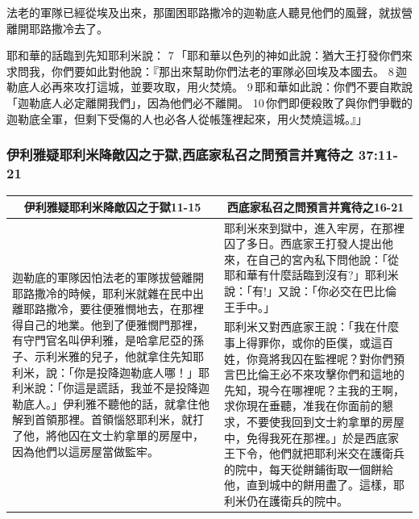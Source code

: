 法老的軍隊已經從埃及出來，那圍困耶路撒冷的迦勒底人聽見他們的風聲，就拔營離開耶路撒冷去了。

耶和華的話臨到先知耶利米說： 7 「耶和華以色列的神如此說：猶大王打發你們來求問我，你們要如此對他說：『那出來幫助你們法老的軍隊必回埃及本國去。 8 迦勒底人必再來攻打這城，並要攻取，用火焚燒。 9 耶和華如此說：你們不要自欺說「迦勒底人必定離開我們」，因為他們必不離開。 10 你們即便殺敗了與你們爭戰的迦勒底全軍，但剩下受傷的人也必各人從帳篷裡起來，用火焚燒這城。』」


\subsubsection{伊利雅疑耶利米降敵囚之于獄,西底家私召之問預言并寬待之 37:11-21}
\begin{table}[H]
\centering
\begin{tabular}{p{}|p{10.0cm}}\hline\hline
\multicolumn{1}{c|}{伊利雅疑耶利米降敵囚之于獄11-15}&\multicolumn{1}{c}{西底家私召之問預言并寬待之16-21}\\\hline
\multirow{2}{7.25cm}{迦勒底的軍隊因怕法老的軍隊拔營離開耶路撒冷的時候，耶利米就雜在民中出離耶路撒冷，要往便雅憫地去，在那裡得自己的地業。他到了便雅憫門那裡，有守門官名叫伊利雅，是哈拿尼亞的孫子、示利米雅的兒子，他就拿住先知耶利米，說：「你是投降迦勒底人哪！」耶利米說：「你這是謊話，我並不是投降迦勒底人。」伊利雅不聽他的話，就拿住他解到首領那裡。首領惱怒耶利米，就打了他，將他囚在文士約拿單的房屋中，因為他們以這房屋當做監牢。}&耶利米來到獄中，進入牢房，在那裡囚了多日。西底家王打發人提出他來，在自己的宮內私下問他說：「從耶和華有什麼話臨到沒有?」耶利米說：「有!」又說：「你必交在巴比倫王手中。」\\\cline{2-2}
&耶利米又對西底家王說：「我在什麼事上得罪你，或你的臣僕，或這百姓，你竟將我囚在監裡呢？對你們預言巴比倫王必不來攻擊你們和這地的先知，現今在哪裡呢？主我的王啊，求你現在垂聽，准我在你面前的懇求，不要使我回到文士約拿單的房屋中，免得我死在那裡。」於是西底家王下令，他們就把耶利米交在護衛兵的院中，每天從餅鋪街取一個餅給他，直到城中的餅用盡了。這樣，耶利米仍在護衛兵的院中。\\\hline
\end{tabular}
\end{table}
 

